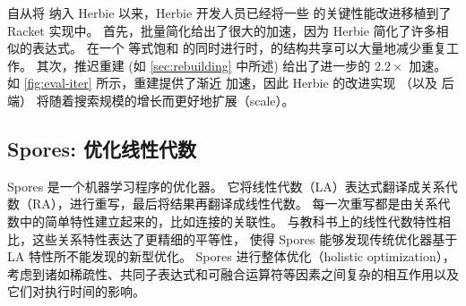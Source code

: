 自从将 \egg 纳入 Herbie 以来，Herbie 开发人员已经将一些
  \egg 的关键性能改进移植到了 Racket \egraph 实现中。
首先，批量简化给出了很大的加速，因为 Herbie 简化了许多相似的表达式。
在一个 等式饱和 的同时进行时，\egraph 的结构共享可以大量地减少重复工作。
其次，推迟重建 (如 \autoref{sec:rebuilding} 中所述) 给出了进一步的 $2.2\times$ 加速。
如 \autoref{fig:eval-iter} 所示，重建提供了渐近
  加速，因此 Herbie 的改进实现 （以及 \egg 后端）
  将随着搜索规模的增长而更好地扩展（scale）。 %

\subsection{Spores: 优化线性代数}
\label{sec:spores}


Spores \cite{spores} 是一个机器学习程序的优化器。
它将线性代数（LA）表达式翻译成关系代数（RA），进行重写，最后将结果再翻译成线性代数。
每一次重写都是由关系代数中的简单特性建立起来的，比如连接的关联性。
与教科书上的线性代数特性相比，这些关系特性表达了更精细的平等性，
使得 Spores 能够发现传统优化器基于 LA 特性所不能发现的新型优化。
Spores 进行整体优化（holistic optimization），
考虑到诸如稀疏性、共同子表达式和可融合运算符等因素之间复杂的相互作用以及它们对执行时间的影响。


